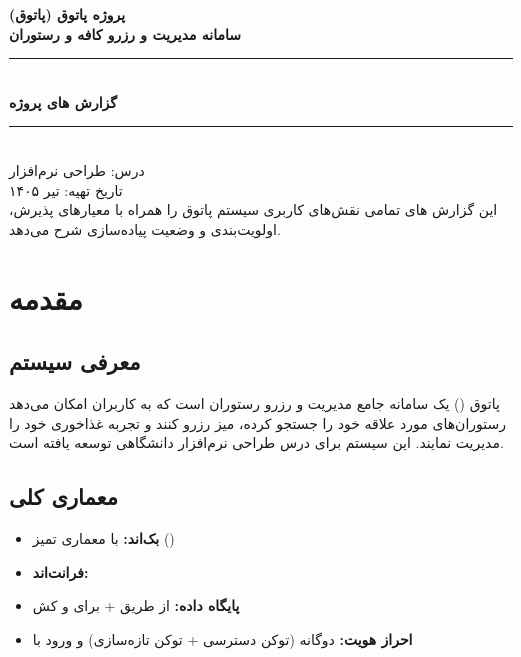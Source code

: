 \documentclass[12pt, a4paper]{article}
\begin{document}

\begin{titlepage}
\centering
\vspace*{2cm}
{\LARGE\bfseries پروژه پاتوق (پاتوق)\\[0.5em]}
{\Large\bfseries سامانه مدیریت و رزرو کافه و رستوران\\[2em]}
\rule{\linewidth}{0.5mm}\\[1em]
{\huge\bfseries\color{primaryorange} گزارش های پروژه}\\[1em]
\rule{\linewidth}{0.5mm}\\[2em]
{\large درس: طراحی نرم‌افزار\\[0.5em]}
{\large تاریخ تهیه: تیر ۱۴۰۵}\\[3em]
\vfill
{\normalsize\color{darkgray}
این گزارش های تمامی نقش‌های کاربری سیستم پاتوق را
همراه با معیارهای پذیرش، اولویت‌بندی و وضعیت پیاده‌سازی
شرح می‌دهد.}
\end{titlepage}

\tableofcontents
\newpage

\section{مقدمه}

\subsection{معرفی سیستم}
پاتوق () یک سامانه جامع مدیریت و رزرو رستوران است که به کاربران امکان می‌دهد
رستوران‌های مورد علاقه خود را جستجو کرده، میز رزرو کنند و تجربه غذاخوری خود را مدیریت نمایند.
این سیستم برای درس طراحی نرم‌افزار دانشگاهی توسعه یافته است.

\subsection{معماری کلی}
\begin{itemize}[rightmargin=0.5cm]
  \item \textbf{بک‌اند:}  با معماری تمیز ()
  \item \textbf{فرانت‌اند:} 
  \item \textbf{پایگاه داده:}  از طریق  +  برای  و کش
  \item \textbf{احراز هویت:}  دوگانه (توکن دسترسی + توکن تازه‌سازی) و ورود با 
\end{itemize}
\end{document}
